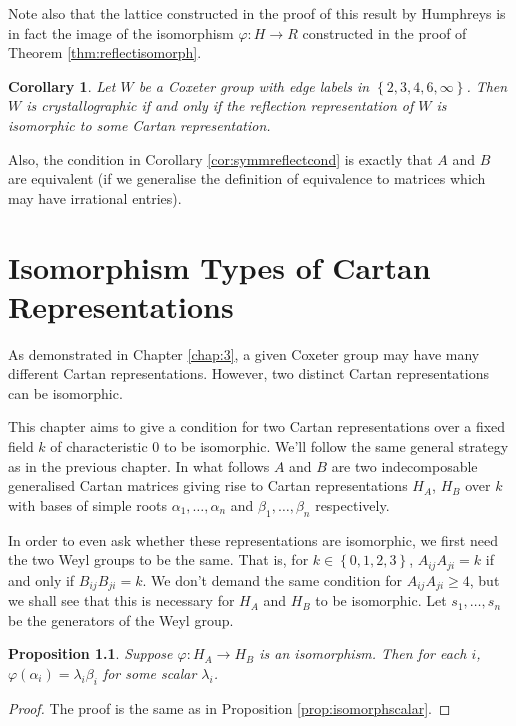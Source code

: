 \documentclass[11pt,a4paper]{report}
\newtheorem{corollary}[theorem]{Corollary}
\newtheorem{proposition}[theorem]{Proposition}
\theoremstyle{definition}
\begin{document}
Note also that the lattice constructed in the proof of this result by Humphreys is in fact the image of the isomorphism $\varphi: H \to R$ constructed in the proof of Theorem \ref{thm:reflectisomorph}.

\begin{corollary}Let $W$ be a Coxeter group with edge labels in $\left\{2,3,4,6,\infty\right\}$. Then $W$ is crystallographic if and only if the reflection representation of $W$ is isomorphic to some Cartan representation. \end{corollary}

Also, the condition in Corollary \ref{cor:symmreflectcond} is exactly that $A$ and $B$ are equivalent (if we generalise the definition of equivalence to matrices which may have irrational entries). 

\chapter{Isomorphism Types of Cartan Representations}

\label{chap:5}
As demonstrated in Chapter \ref{chap:3}, a given Coxeter group may have many different Cartan representations. However, two distinct Cartan representations can be isomorphic.

This chapter aims to give a condition for two Cartan representations over a fixed field $k$ of characteristic $0$ to be isomorphic. We'll follow the same general strategy as in the previous chapter. In what follows $A$ and $B$ are two indecomposable generalised Cartan matrices giving rise to Cartan representations $H_A$, $H_B$ over $k$ with bases of simple roots $\alpha_1, \ldots, \alpha_n$ and $\beta_1, \ldots, \beta_n$ respectively.

In order to even ask whether these representations are isomorphic, we first need the two Weyl groups to be the same. That is, for $k \in \left\{0,1,2,3\right\}$, $A_{ij} A_{ji} = k$ if and only if $B_{ij} B_{ji} = k$. We don't demand the same condition for $A_{ij} A_{ji} \geq 4$, but we shall see that this is necessary for $H_A$ and $H_B$ to be isomorphic. Let $s_1, \ldots, s_n$ be the generators of the Weyl group.

\begin{proposition} Suppose $\varphi: H_A \to H_B$ is an isomorphism. Then for each $i$, $\varphi(\alpha_i) = \lambda_i \beta_i$ for some scalar $\lambda_i$.\end{proposition}

\begin{proof} The proof is the same as in Proposition \ref{prop:isomorphscalar}.\end{proof}
\end{document}
